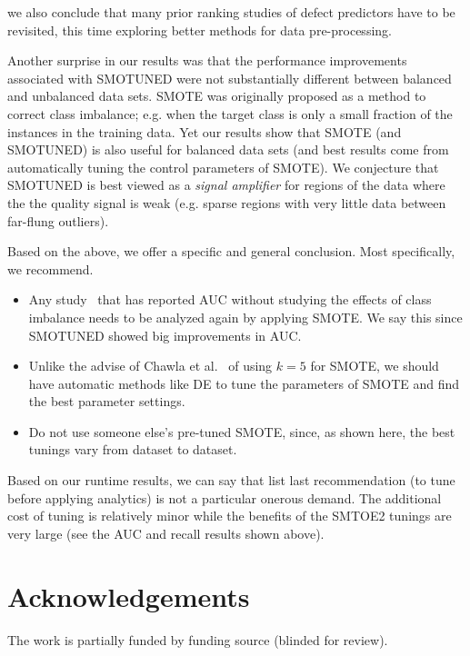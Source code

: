 \documentclass[10pt,conference]{IEEEtran}
\newcommand{\bi}{\begin{itemize}[leftmargin=0.4cm]}
\newcommand{\ei}{\end{itemize}}
\theoremstyle{break}
\theoremstyle{break}
\newcommand{\sma}{{\sc SMOTE}}
\newcommand{\smb}{{\sc SMOTUNED}}
\begin{document}
we also conclude that many prior ranking studies of defect predictors
have to be revisited, this time exploring better methods for data pre-processing. 


Another surprise in our results was that the performance improvements associated with {\smb} were not substantially different between balanced and unbalanced data sets.
 {\sma} was originally proposed as a method to correct class imbalance; e.g. when the target class is only a small fraction of the instances in the training data.
 Yet our results show that SMOTE (and SMOTUNED) is also useful for balanced data sets (and best results come from automatically tuning the control parameters of SMOTE). We conjecture that SMOTUNED
is best viewed as a   {\em signal amplifier} for regions of the data where the the quality signal is weak  (e.g. sparse regions with very little data between far-flung outliers). 


Based on the above, we offer a specific and general conclusion. Most specifically, we recommend.
\bi
 \item Any study~\cite{ghotra2015revisiting} that has reported AUC without studying the effects of class imbalance needs to be analyzed again by applying SMOTE. We say this since SMOTUNED showed big improvements in AUC.
 \item Unlike the advise of Chawla et al.~\cite{chawla2002smote} of using $k=5$ for SMOTE, we should have automatic methods like DE to tune the parameters of SMOTE and find the best parameter settings.
 \item Do not use someone else's pre-tuned SMOTE, since, as shown here, the best tunings vary from dataset to dataset.
\ei
Based on our runtime results, we can say that list last
recommendation (to tune before applying analytics) is not  a particular
onerous demand. The additional cost of tuning
is relatively minor while the benefits of the SMTOE2 tunings
are very large (see the   AUC and recall results shown above).


\section*{Acknowledgements}
The work is partially funded by
funding source (blinded for review).



\balance



%
\medskip
 
\end{document}
